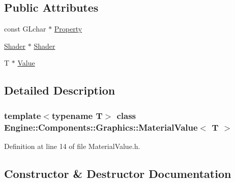 \subsection*{Public Attributes}
\begin{DoxyCompactItemize}
\item 
const G\+Lchar $\ast$ \mbox{\hyperlink{classEngine_1_1Components_1_1Graphics_1_1MaterialValueBase_a53f5d1edea5f564931535250d3f5039c}{Property}}
\item 
\mbox{\hyperlink{classEngine_1_1Components_1_1Graphics_1_1Shader}{Shader}} $\ast$ \mbox{\hyperlink{classEngine_1_1Components_1_1Graphics_1_1MaterialValueBase_a45fd55d67557a2975f1274aa41045512}{Shader}}
\item 
T $\ast$ \mbox{\hyperlink{classEngine_1_1Components_1_1Graphics_1_1MaterialValue_a1fbe4d2c3c1cf6c1538cf0012a78cb6e}{Value}}
\end{DoxyCompactItemize}


\subsection{Detailed Description}
\subsubsection*{template$<$typename T$>$\newline
class Engine\+::\+Components\+::\+Graphics\+::\+Material\+Value$<$ T $>$}



Definition at line 14 of file Material\+Value.\+h.



\subsection{Constructor \& Destructor Documentation}
\mbox{\label{classEngine_1_1Components_1_1Graphics_1_1MaterialValue_ac360e2391eea68445b15c3fafb536e40}} 
